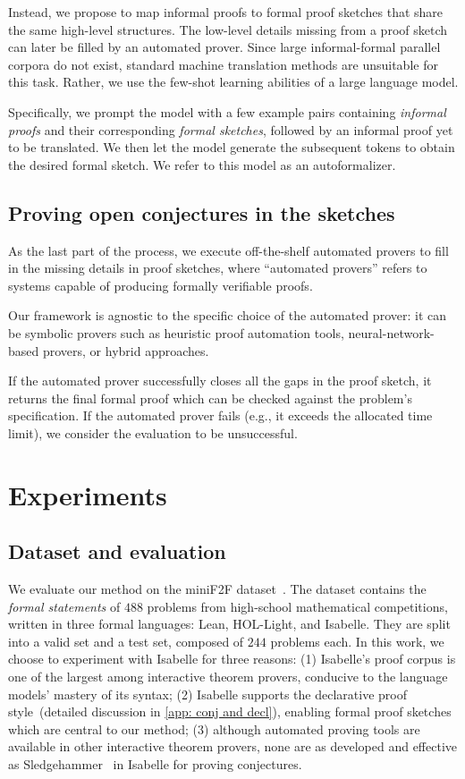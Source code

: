 Instead, we propose to map informal proofs to formal proof sketches that share the same high-level structures. The low-level details missing from a proof sketch can later be filled by an automated prover. Since large informal-formal parallel corpora do not exist, standard machine translation methods are unsuitable for this task. Rather, we use the few-shot learning abilities of a large language model.

Specifically, we prompt the model with a few example pairs containing \textit{informal proofs} and their corresponding \textit{formal sketches}, followed by an informal proof yet to be translated. We then let the model generate the subsequent tokens to obtain the desired formal sketch. We refer to this model as an autoformalizer.

\subsection{Proving open conjectures in the sketches}

As the last part of the process, we execute off-the-shelf automated provers to fill in the missing details in proof sketches, where ``automated provers'' refers to systems capable of producing formally verifiable proofs.

Our framework is agnostic to the specific choice of the automated prover: it can be symbolic provers such as heuristic proof automation tools, neural-network-based provers, or hybrid approaches.

If the automated prover successfully closes all the gaps in the proof sketch, it returns the final formal proof which can be checked against the problem's specification. If the automated prover fails (e.g., it exceeds the allocated time limit), we consider the evaluation to be unsuccessful.

\section{Experiments}
\label{sec:exp}
\subsection{Dataset and evaluation}

We evaluate our method on the miniF2F dataset~\citep{zheng2021minif2f}. The dataset contains the \textit{formal statements} of $488$ problems from high-school mathematical competitions, written in three formal languages: Lean, HOL-Light, and Isabelle. They are split into a valid set and a test set, composed of $244$ problems each. In this work, we choose to experiment with Isabelle for three reasons: (1) Isabelle's proof corpus is one of the largest among interactive theorem provers, conducive to the language models' mastery of its syntax; (2) Isabelle supports the declarative proof style~(detailed discussion in \autoref{app: conj and decl}), enabling formal proof sketches~\citep{wiedijk2003formal} which are central to our method; (3) although automated proving tools are available in other interactive theorem provers, none are as developed and effective as Sledgehammer~\citep{paulson2010three} in Isabelle for proving conjectures.

